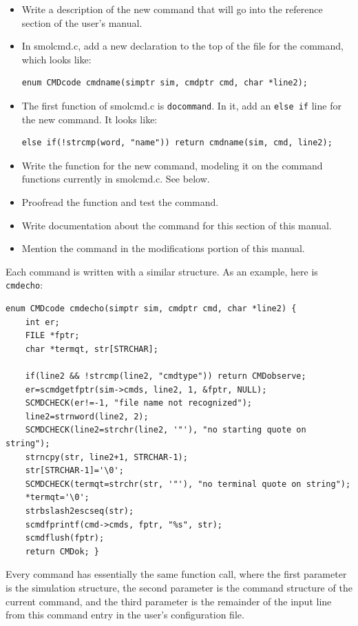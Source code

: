 \documentclass {scrbook}
\newcommand {\ttt} {\texttt}
\begin{document}
\begin{itemize}
\item Write a description of the new command that will go into the reference section of the user's manual.
\item In smolcmd.c, add a new declaration to the top of the file for the command, which looks like:
\begin{lstlisting}
enum CMDcode cmdname(simptr sim, cmdptr cmd, char *line2);
\end{lstlisting}
\item The first function of smolcmd.c is \ttt{docommand}. In it, add an \ttt{else if} line for the new command. It looks like:
\begin{lstlisting}
else if(!strcmp(word, "name")) return cmdname(sim, cmd, line2);
\end{lstlisting}
\item Write the function for the new command, modeling it on the command functions currently in smolcmd.c. See below.
\item Proofread the function and test the command.
\item Write documentation about the command for this section of this manual.
\item Mention the command in the modifications portion of this manual.
\end{itemize}

Each command is written with a similar structure. As an example, here is \ttt{cmdecho}:

\begin{lstlisting}
enum CMDcode cmdecho(simptr sim, cmdptr cmd, char *line2) {
	int er;
	FILE *fptr;
	char *termqt, str[STRCHAR];

	if(line2 && !strcmp(line2, "cmdtype")) return CMDobserve;
	er=scmdgetfptr(sim->cmds, line2, 1, &fptr, NULL);
	SCMDCHECK(er!=-1, "file name not recognized");
	line2=strnword(line2, 2);
	SCMDCHECK(line2=strchr(line2, '"'), "no starting quote on string");
	strncpy(str, line2+1, STRCHAR-1);
	str[STRCHAR-1]='\0';
	SCMDCHECK(termqt=strchr(str, '"'), "no terminal quote on string");
	*termqt='\0';
	strbslash2escseq(str);
	scmdfprintf(cmd->cmds, fptr, "%s", str);
	scmdflush(fptr);
	return CMDok; }
\end{lstlisting}

Every command has essentially the same function call, where the first parameter is the simulation structure, the second parameter is the command structure of the current command, and the third parameter is the remainder of the input line from this command entry in the user's configuration file.
\end{document}
